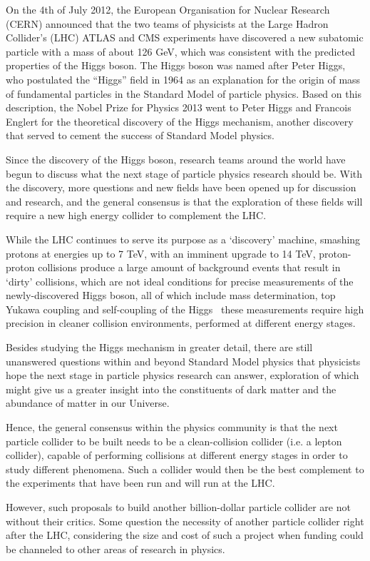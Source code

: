On the 4th of July 2012, the European Organisation for Nuclear Research (CERN) announced that the two teams of physicists at the Large Hadron Collider's (LHC) ATLAS and CMS experiments have discovered a new subatomic particle with a mass of about 126 GeV, which was consistent with the predicted properties of the Higgs boson. The Higgs boson was named after Peter Higgs, who postulated the ``Higgs'' field in 1964 as an explanation for the origin of mass of fundamental particles in the Standard Model of particle physics. Based on this description, the Nobel Prize for Physics 2013 went to Peter Higgs and Francois Englert for the theoretical discovery of the Higgs mechanism, another discovery that served to cement the success of Standard Model physics.
 
Since the discovery of the Higgs boson, research teams around the world have begun to discuss what the next stage of particle physics research should be. With the discovery, more questions and new fields have been opened up for discussion and research, and the general consensus is that the exploration of these fields will require a new high energy collider to complement the LHC.
 
While the LHC continues to serve its purpose as a `discovery' machine, smashing protons at energies up to 7 TeV, with an imminent upgrade to 14 TeV, proton-proton collisions produce a large amount of background events that result in `dirty' collisions, which are not ideal conditions for precise measurements of the newly-discovered Higgs boson, all of which include mass determination, top Yukawa coupling and self-coupling of the Higgs  \textemdash \, these measurements require high precision in cleaner collision environments, performed at different energy stages.
 
Besides studying the Higgs mechanism in greater detail, there are still unanswered questions within and beyond Standard Model physics that physicists hope the next stage in particle physics research can answer, exploration of which might give us a greater insight into the constituents of dark matter and the abundance of matter in our Universe.
 
Hence, the general consensus within the physics community is that the next particle collider to be built needs to be a clean-collision collider (i.e. a lepton collider), capable of performing collisions at different energy stages in order to study different phenomena. Such a collider would then be the best complement to the experiments that have been run and will run at the LHC.
 
However, such proposals to build another billion-dollar particle collider are not without their critics. Some question the necessity of another particle collider right after the LHC, considering the size and cost of such a project when funding could be channeled to other areas of research in physics.